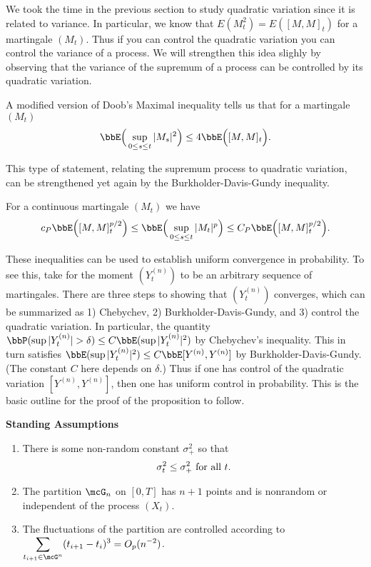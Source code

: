 \documentclass{report}
\begin{document}
We took the time in the previous section to study quadratic variation
since it is related to variance.  In particular, we know that
$E(M_t^2) = E([M,M]_t)$ for a martingale $(M_t)$.  Thus if you can
control the quadratic variation you can control the variance of a
process.  We will strengthen this idea slighly by observing that the
variance of the supremum of a process can be controlled by its
quadratic variation.  

\begin{theorem}
A modified version of Doob's Maximal inequality tells us that for a
martingale $(M_t)$
\[
\bbE \Big( \sup_{0 \leq s \leq t} |M_s|^2 \Big) \leq 4 \bbE \Big(
[M,M]_t \Big).
\]
\end{theorem}

This type of statement, relating the supremum process to quadratic
variation, can be strengthened yet again by the Burkholder-Davis-Gundy
inequality.  

\begin{theorem}
For a continuous martingale $(M_t)$ we have
\[
c_P \bbE \Big( [M,M]_t^{p/2} \Big) 
\leq \bbE \Big( \sup_{0 \leq s \leq t} |M_t|^p \Big)
\leq C_P \bbE \Big( [M,M]_t^{p/2} \Big).
\]
\end{theorem}

These inequalities can be used to establish uniform convergence in
probability.   To see this, take for the moment $(Y^{(n)}_t)$ to be an
arbitrary sequence of martingales.  There are three steps to showing
that $(Y^{(n)}_t)$ converges, which can be summarized as 1) Chebychev,
2) Burkholder-Davis-Gundy, and 3) control the quadratic variation.  
In particular, the quantity $\bbP( \sup |Y^{(n)}_t| > \delta) \leq C
\bbE( \sup |Y^{(n)}_t|^2)$ by Chebychev's inequality.  This in turn
satisfies $\bbE( \sup |Y^{(n)}_t|^2) \leq C \bbE[Y^{(n)},Y^{(n)}]$ by
Burkholder-Davis-Gundy.  (The constant $C$ here depends on $\delta$.) 
Thus if one has control of the quadratic variation
$[Y^{(n)},Y^{(n)}]$, then one has uniform control in probability. 
This is the basic outline for the proof of the proposition to follow.

\vspace{10pt} \noindent \textbf{Standing Assumptions}
\begin{enumerate}
\item There is some non-random constant $\sigma_+^2$ so that
\[
\sigma_t^2 \leq \sigma_+^2 \textmd{ for all } t.
\]
\item The partition $\mcG_n$ on $[0,T]$ has $n+1$ points and is
nonrandom or independent of the process $(X_t)$.
\item The fluctuations of the partition are controlled according to
$\displaystyle \sum_{t_{i+1} \in \mcG^n} (t_{i+1} - t_i)^3 =
O_p(n^{-2})$.
\end{enumerate}
\end{document}
